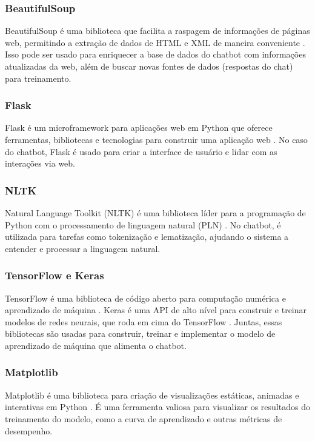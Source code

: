 \documentclass[conference]{IEEEtran}
\begin{document}
\subsubsection{BeautifulSoup}
BeautifulSoup é uma biblioteca que facilita a raspagem de informações de páginas web, 
permitindo a extração de dados de HTML e XML de maneira conveniente \cite{Richardson2007}. 
Isso pode ser usado para enriquecer a base de dados do chatbot com informações atualizadas da web,
além de buscar novas fontes de dados (respostas do chat) para treinamento.

\subsubsection{Flask}
Flask é um microframework para aplicações web em Python que oferece ferramentas, 
bibliotecas e tecnologias para construir uma aplicação web \cite{Grinberg2018}. 
No caso do chatbot, Flask é usado para criar a interface de usuário e lidar com as interações via web.

\subsubsection{NLTK}
Natural Language Toolkit (NLTK) é uma biblioteca líder para a programação de Python 
com o processamento de linguagem natural (PLN) \cite{Bird2009}.
No chatbot, é utilizada para tarefas como tokenização e lematização, 
ajudando o sistema a entender e processar a linguagem natural.

\subsubsection{TensorFlow e Keras}
TensorFlow é uma biblioteca de código aberto para computação numérica e aprendizado de máquina \cite{Abadi2016}. 
Keras é uma API de alto nível para construir e treinar modelos de redes neurais, 
que roda em cima do TensorFlow \cite{Chollet2015}. 
Juntas, essas bibliotecas são usadas para construir, treinar e implementar 
o modelo de aprendizado de máquina que alimenta o chatbot.

\subsubsection{Matplotlib}
Matplotlib é uma biblioteca para criação de visualizações estáticas, 
animadas e interativas em Python \cite{Hunter2007}. 
É uma ferramenta valiosa para visualizar os resultados do treinamento do modelo, 
como a curva de aprendizado e outras métricas de desempenho.
\end{document}
